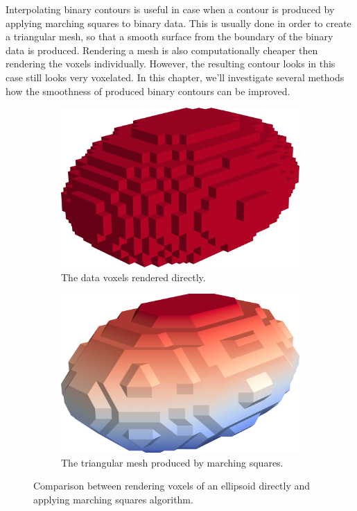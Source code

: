 \documentclass[a4paper,10pt]{report}
\begin{document}
Interpolating binary contours is useful in case when a contour is produced by applying marching squares to binary data. This is usually done in order to create a triangular mesh, so that a smooth surface from the boundary of the binary data is produced. Rendering a mesh is also computationally cheaper then rendering the voxels individually. However, the resulting contour looks in this case still looks very voxelated. In this chapter, we'll investigate several methods how the smoothness of produced binary contours can be improved.
\begin{figure}[H]
    \centering
    \begin{subfigure}{.49\textwidth}
        \includegraphics[width=\textwidth]{../images/3D/Ellipsoid_blocks.png}
    \caption{The data voxels rendered directly.}
    \label{fig:Ellipsoid_blocks}
    \end{subfigure}
    \hfill
    \begin{subfigure}{.49\textwidth}
        \includegraphics[width=\textwidth]{../images/3D/Ellipsoid_marching_squares.png}
    \caption{The triangular mesh produced by marching squares.}
    \label{fig:Ellipsoid_marching_squares}
    \end{subfigure}
    \caption{Comparison between rendering voxels of an ellipsoid directly and applying marching squares algorithm.}
    \label{fig:Ellipsoid}
\end{figure}
\end{document}
